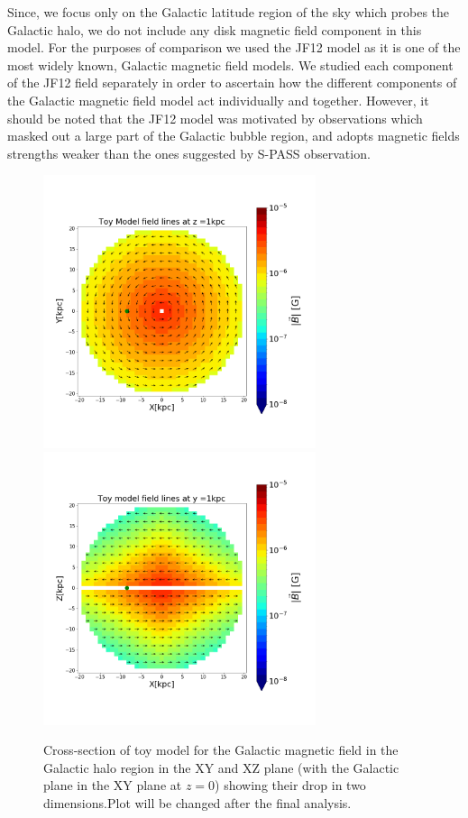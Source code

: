 \documentclass[12pt, a4 paper]{article}
\newcommand{\Arjen}[1]{{\color{brown}#1}}
\newcommand{\Vasu}[1]{{\color{purple}#1}}
\begin{document}
Since, we focus only on the Galactic latitude region of the sky which probes the Galactic halo, we do not include any disk magnetic field component in this model. 
For the purposes of comparison we used the JF12 model as it is one of the most widely known, Galactic magnetic field models.
We studied each component of the JF12 field separately in order to ascertain how the different components of the Galactic magnetic field model act individually and together. However, it should be noted that the JF12 model was motivated by observations which masked out a large part of the Galactic bubble region, and adopts magnetic fields strengths weaker than the ones suggested by S-PASS observation.%
\begin{figure}[h!]
    \centering
    \includegraphics[width = 8cm]{Images/toymodel_XY_6Sep.png}%
    \includegraphics[width = 8cm]{Images/toymodel_XZ_6Sep.png}
    \caption{Cross-section of toy model for the Galactic magnetic field in the Galactic halo region in the XY and XZ plane (with the Galactic plane in the XY plane at $z=0$) showing their drop in two dimensions.\Vasu{Plot will be changed after the final analysis.} }
    \label{fig:Vis_TM}
\end{figure}
\clearpage
\end{document}
